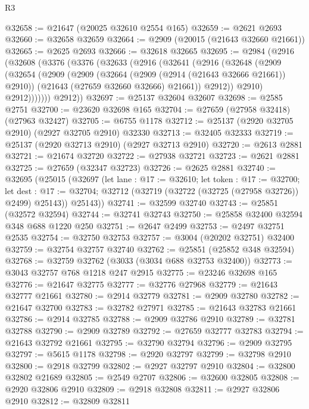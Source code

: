 \begin{lexlean}{R3}
\begin{coremodule}
@32658 := @21647 (@20025 @32610 @2554 @165)
@32659 := @2621 @2693
@32660 := @32658 @32659
@32664 := @2909 (@20015 (@21643 @32660 @21661))
@32665 := @2625 @2693
@32666 := @32618 @32665
@32695 := @2984
    (@2916
      (@32608
        (@3376
          (@3376
            (@32633
              (@2916
                (@32641
                  (@2916
                    (@32648
                      (@2909
                        (@32654
                          (@2909
                            (@2909
                              (@32664 (@2909 (@2914 (@21643 @32666 @21661)) @2910))
                              (@21643 (@27659 @32660 @32666) @21661))
                            @2912))
                        @2910)
                      @2912)))))))
        @2912))
@32697 := @25137 @32604 @32607
@32698 := @2585 @2751
@32700 := @23620 @32698 @165
@32704 := @27659 (@27958 @32418) (@27963 @32427)
@32705 := @6755 @1178
@32712 := @25137 (@2920 @32705 @2910) (@2927 @32705 @2910) @32330
@32713 := @32405 @32333
@32719 := @25137 (@2920 @32713 @2910) (@2927 @32713 @2910)
@32720 := @2613 @2881
@32721 := @21674 @32720
@32722 := @27938 @32721
@32723 := @2621 @2881
@32725 := @27659 (@32347 @32723)
@32726 := @2625 @2881
@32740 := @32695
    (@25015
      (@32697
        (let lane : @17 := @32610;
        let token : @17 := @32700;
        let dest : @17 := @32704; @32712 (@32719 (@32722 (@32725 (@27958 @32726)) @2499) @25143))
        @25143))
@32741 := @32599 @32740
@32743 := @25851 (@32572 @32594)
@32744 := @32741 @32743
@32750 := @25858 @32400 @32594 @348 @688 @1220 @250
@32751 := @2647 @2499
@32753 := @2497 @32751 @2535
@32754 := @32750 @32753
@32757 := @3004 (@20202 @32751) @32400
@32759 := @32754 @32757 @32740
@32762 := @25851 (@25852 @348 @32594)
@32768 := @32759 @32762 (@3033 (@3034 @688 @32753 @32400))
@32773 := @3043 @32757 @768 @1218 @247 @2915
@32775 := @23246 @32698 @165
@32776 := @21647 @32775
@32777 := @32776 @27968
@32779 := @21643 @32777 @21661
@32780 := @2914 @32779
@32781 := @2909 @32780
@32782 := @21647 @32700
@32783 := @32782 @27971
@32785 := @21643 @32783 @21661
@32786 := @2914 @32785
@32788 := @2909 @32786 @2910
@32789 := @32781 @32788
@32790 := @2909 @32789
@32792 := @27659 @32777 @32783
@32794 := @21643 @32792 @21661
@32795 := @32790 @32794
@32796 := @2909 @32795
@32797 := @5615 @1178
@32798 := @2920 @32797
@32799 := @32798 @2910
@32800 := @2918 @32799
@32802 := @2927 @32797 @2910
@32804 := @32800 @32802 @21689
@32805 := @2549 @2707
@32806 := @32600 @32805
@32808 := @2920 @32806 @2910
@32809 := @2918 @32808
@32811 := @2927 @32806 @2910
@32812 := @32809 @32811

\end{coremodule}
\end{lexlean}
